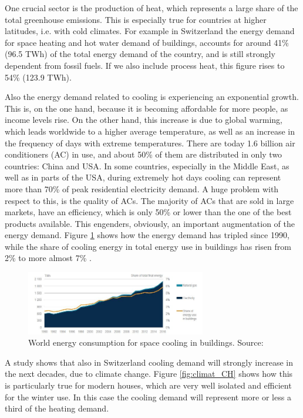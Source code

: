 \documentclass{article}
\begin{document}
One crucial sector is the production of heat, which represents a large share of the total greenhouse emissions. This is especially true for countries at higher latitudes, i.e. with cold climates. For example in Switzerland the energy demand for space heating and hot water demand of buildings, accounts for around 41\% (96.5 TWh) of the total energy demand of the country, and is still strongly dependent from fossil fuels. If we also include process heat, this figure rises to 54\% (123.9 TWh)\cite{bacherEnergieRespektSchlusselFur2014}. 

Also the energy demand related to cooling is experiencing an exponential growth. This is, on the one hand, because it is becoming affordable for more people, as income levels rise. On the other hand, this increase is due to global warming, which leads worldwide to a higher average temperature, as well as an increase in the frequency of days with extreme temperatures\cite{ipccSummaryPolicymakersIPCC2018}. There are today 1.6 billion air conditioners (AC) in use, and about 50\% of them are distributed in only two countries: China and USA. In some countries, especially in the Middle East, as well as in parts of the USA, during extremely hot days cooling can represent more than 70\% of peak residential electricity demand. A huge problem with respect to this, is the quality of ACs. The majority of ACs that are sold in large markets, have an efficiency, which is only 50\% or lower than the one of the best products available. This engenders, obviously, an important augmentation of the energy demand. Figure \ref{fig:cooling_energy} shows how the energy demand has tripled since 1990, while the share of cooling energy in total energy use in buildings has risen from 2\% to more almost 7\% \cite{birolFutureCooling2018}. 

\begin{figure}[h!]
	\centering
	\includegraphics[width=0.7\textwidth]{cooling_energy.JPG}
	\caption{World energy consumption for space cooling in buildings. Source:\cite{birolFutureCooling2018}}
	\label{fig:cooling_energy}
\end{figure}

A study shows that also in Switzerland cooling demand will strongly increase in the next decades, due to climate change. Figure \ref{fig:climat_CH} shows how this is particularly true for modern houses, which are very well isolated and efficient for the winter use. In this case the cooling demand will represent more or less a third of the heating demand\cite{hsluClimaBauPlanenAngesichts2017}.\\
\end{document}
